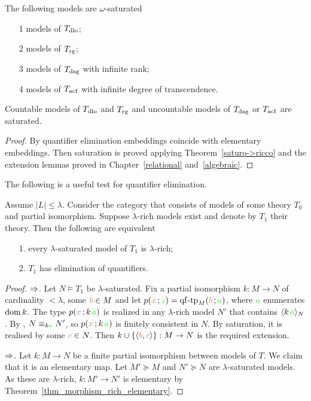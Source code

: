 \documentclass[creche.tex]{subfiles}
\begin{document}
\begin{corollary}
The following models are $\omega\mbox{-}$saturated
\begin{itemize}
\item[1] models of $T_{\rm dlo}$;
\item[2] models of $T_{\rm rg}$;
\item[3] models of $T_{\rm dag}$ with infinite rank;
\item[4] models of $T_{\rm acf}$ with infinite degree of transcendence.
\end{itemize}
Countable models of $T_{\rm dlo}$ and $T_{\rm rg}$ and uncountable models of $T_{\rm dag}$ or $T_{\rm acf}$ are saturated. 
\end{corollary}
\begin{proof}
By quantifier elimination embeddings coincide with elementary embeddings. Then saturation is proved applying Theorem~\ref{saturo->ricco} and the extension lemmas proved in Chapter~\ref{relational} and~\ref{algebraic}.
\end{proof}

The following is a useful test for quantifier elimination.

\begin{theorem}\label{thm_ricchezza_saturazione_QE}
Assume $|L|\le\lambda$. Consider the category that consists of models of some theory $T_0$ and partial isomorphism. Suppose $\lambda\mbox{-}$rich models exist and denote by $T_1$ their theory. Then the following are equivalent
\begin{itemize}
\item[1.] every $\lambda\mbox{-}$saturated model of $T_1$ is $\lambda\mbox{-}$rich;
\item[2.] $T_1$ has elimination of quantifiers.
\end{itemize}
\end{theorem}

\begin{proof}$\Rightarrow$. Let $N\models T_1$ be $\lambda\mbox{-}$saturated. Fix a partial isomorphism $k:M\to N$ of cardinality $<\lambda$, some ${\color{brown} b}\in M$ and let $p({\color{brown} x}\,;{\color{green} z})={\rm qf\mbox{-}tp}_M({\color{brown} b}\,;{\color{green} a})$, where ${\color{green} a}$ enumerates $\mathop{\rm dom} k$. The type $p({\color{brown} x}\,;k\,{\color{green} a})$ is realized in any $\lambda\mbox{-}$rich model $N'$ that contains $\langle k\,{\color{green} a}\rangle_N$. By , $N\equiv_{k{\color{green} a}} N'$, so $p({\color{brown} x}\,;k\,{\color{green} a})$ is finitely consistent in $N$.  By saturation, it is realised by some ${\color{brown} c}\in N$. Then $k\cup \{\langle{\color{brown}b},{\color{brown} c}\rangle\}:M\to N$ is the required extension.


$\Rightarrow$. Let $k:M\to N$ be a finite partial isomorphism between models of $T$. We claim that it is an elementary map. Let $M'\succeq M$ and $N'\succeq N$ are $\lambda$-saturated models. As these are $\lambda$-rich, $k:M'\to N'$ is elementary by Theorem~\ref{thm_morphism_rich_elementary}.
\end{proof}
\end{document}
